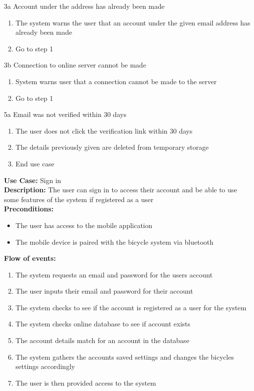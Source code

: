 \documentclass[a4paper]{report}
\begin{document}
3a Account under the address has already been made
\begin{enumerate}
\item The system warns the user that an account under the given email address has already been made
\item Go to step 1
\end{enumerate}
3b Connection to online server cannot be made
\begin{enumerate}
\item System warns user that a connection cannot be made to the server
\item Go to step 1
\end{enumerate}
5a Email was not verified within 30 days
\begin{enumerate}
\item The user does not click the verification link within 30 days
\item The details previously given are deleted from temporary storage
\item End use case
\end{enumerate}
\textbf{Use Case:} Sign in\\
\textbf{Description:} The user can sign in to access their account and be able to use some features of the system if registered as a user\\
\textbf{Preconditions:} \begin{itemize}
\item The user has access to the mobile application
\item The mobile device is paired with the bicycle system via bluetooth
\end{itemize}
\textbf{Flow of events:} \begin{enumerate}
\item The system requests an email and password for the users account
\item The user inputs their email and password for their account
\item The system checks to see if the account is registered as a user for the system
\item The system checks online database to see if account exists
\item The account details match for an account in the database
\item The system gathers the accounts saved settings and changes the bicycles settings accordingly
\item The user is then provided access to the system
\end{enumerate}
\end{document}
